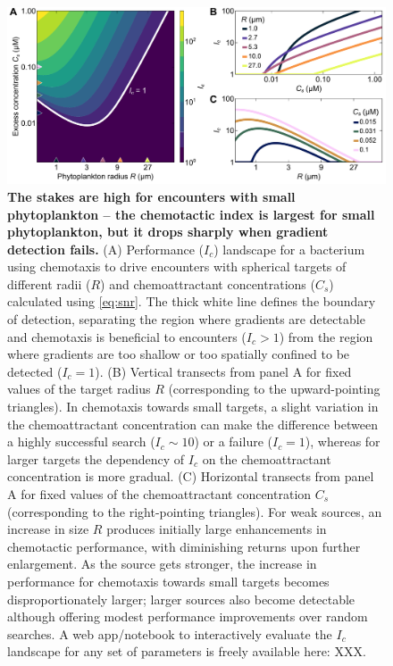 \documentclass[9pt,twocolumn,twoside]{pnas-new}
\begin{document}
\begin{figure}
    \centering
    \includegraphics[width=17.8cm]{fig3_mod.pdf}
    \caption{
        \textbf{
        The stakes are high for encounters with small phytoplankton -- the chemotactic index is largest for small phytoplankton, but it drops sharply when gradient detection fails.
        }
        (A) Performance ($I_c$) landscape for a bacterium using chemotaxis to drive encounters with spherical targets of different radii ($R$) and chemoattractant concentrations ($C_s$) calculated using \autoref{eq:snr}.
        The thick white line defines the boundary of detection, separating the region where gradients are detectable and chemotaxis is beneficial to encounters ($I_c > 1$) from the region where gradients are too shallow or too spatially confined to be detected ($I_c = 1$).
        (B) Vertical transects from panel A for fixed values of the target radius $R$ (corresponding to the upward-pointing triangles).
        In chemotaxis towards small targets, a slight variation in the chemoattractant concentration can make the difference between a highly successful search ($I_c\sim10$) or a failure ($I_c=1$), whereas for larger targets the dependency of $I_c$ on the chemoattractant concentration is more gradual.
        (C) Horizontal transects from panel A for fixed values of the chemoattractant concentration $C_s$ (corresponding to the right-pointing triangles).
        For weak sources, an increase in size $R$ produces initially large enhancements in chemotactic performance, with diminishing returns upon further enlargement.
        As the source gets stronger, the increase in performance for chemotaxis towards small targets becomes disproportionately larger; larger sources also become detectable although offering modest performance improvements over random searches.
        {\color{magenta}A web app/notebook to interactively evaluate the $I_c$ landscape for any set of parameters is freely available here: XXX.}
    }
    \label{fig:asymmetric-performance}
\end{figure}
\end{document}
